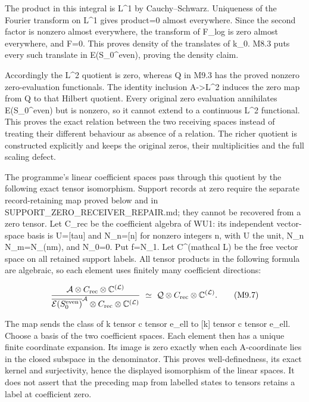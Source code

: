 The product in this integral is L\^{}1 by Cauchy--Schwarz. Uniqueness of
the Fourier transform on L\^{}1 gives product=0 almost everywhere. Since
the second factor is nonzero almost everywhere, the transform of F\_log
is zero almost everywhere, and F=0. This proves density of the
translates of k\_0. M8.3 puts every such translate in E(S\_0\^{}even),
proving the density claim.

Accordingly the L\^{}2 quotient is zero, whereas Q in M9.3 has the
proved nonzero zero-evaluation functionals. The identity inclusion
A-\textgreater L\^{}2 induces the zero map from Q to that Hilbert
quotient. Every original zero evaluation annihilates E(S\_0\^{}even) but
is nonzero, so it cannot extend to a continuous L\^{}2 functional. This
proves the exact relation between the two receiving spaces instead of
treating their different behaviour as absence of a relation. The richer
quotient is constructed explicitly and keeps the original zeros, their
multiplicities and the full scaling defect.

The programme's linear coefficient spaces pass through this quotient by
the following exact tensor isomorphism. Support records at zero require
the separate record-retaining map proved below and in
SUPPORT\_ZERO\_RECEIVER\_REPAIR.md; they cannot be recovered from a zero
tensor. Let C\_rec be the coefficient algebra of WU1: its independent
vector-space basis is U={[}tau{]} and N\_n={[}n{]} for nonzero integers
n, with U the unit, N\_n N\_m=N\_(nm), and N\_0=0. Put f=N\_1. Let
C\^{}(mathcal L) be the free vector space on all retained support
labels. All tensor products in the following formula are algebraic, so
each element uses finitely many coefficient directions:

\[
\frac{\mathcal A\otimes C_{\rm rec}\otimes\mathbb C^{(\mathcal L)}}
{\overline{\mathcal E(S_0^{\rm even})}^{\mathcal A}
\otimes C_{\rm rec}\otimes\mathbb C^{(\mathcal L)}}
\ \simeq\
\mathcal Q\otimes C_{\rm rec}\otimes\mathbb C^{(\mathcal L)}.
\tag{M9.7}
\]

The map sends the class of k tensor c tensor e\_ell to {[}k{]} tensor c
tensor e\_ell. Choose a basis of the two coefficient spaces. Each
element then has a unique finite coordinate expansion. Its image is zero
exactly when each A-coordinate lies in the closed subspace in the
denominator. This proves well-definedness, its exact kernel and
surjectivity, hence the displayed isomorphism of the linear spaces. It
does not assert that the preceding map from labelled states to tensors
retains a label at coefficient zero.

